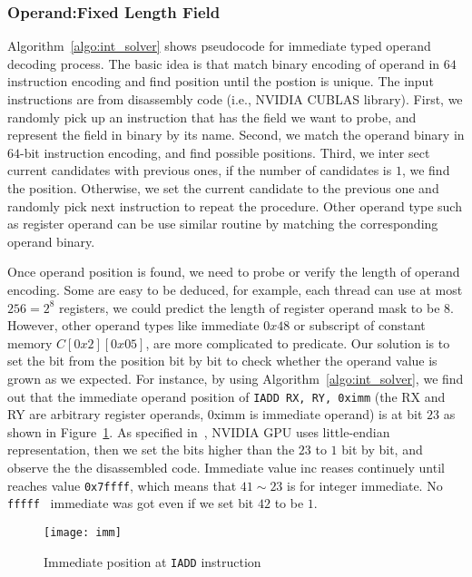 \subsubsection{Operand:Fixed Length Field}
Algorithm~\ref{algo:int_solver} shows pseudocode for immediate typed operand decoding process. 
The basic idea is that match binary encoding of operand in $64$ instruction encoding and find
position until the postion is unique. The input instructions are from disassembly code (i.e., NVIDIA CUBLAS library).
First, we randomly pick up an instruction that has the field we want to probe, and represent the field in binary by its 
name. Second, we match the operand binary in $64$-bit instruction encoding, and find possible positions. Third, we inter
sect current candidates with previous ones, if the number of candidates is $1$, we find the position. Otherwise, we set 
the current candidate to the previous one and randomly pick next instruction to repeat the procedure.
Other operand type such as register operand can be use similar routine by matching the corresponding operand binary.

Once operand position is found, we need to probe or verify the length of operand encoding. Some are easy to be
deduced, for example, each thread can use at most $256=2^{8}$ registers, we could predict the length of register operand
 mask to be $8$.
However, other operand types like immediate $0x48$ or subscript of constant memory $C[0x2][0x05]$, are more complicated 
to predicate. Our solution is to set the bit from the position bit by bit to check whether the operand value is grown as
 we expected. For instance, by using Algorithm~\ref{algo:int_solver}, we find out that the immediate operand position of
 {\tt IADD RX, RY, 0ximm} (the RX and RY are arbitrary register operands, 0ximm is immediate operand) is at bit $23$ as 
shown in Figure~\ref{fig:imm}. As specified in~\cite{cuda2015programming}, NVIDIA GPU uses little-endian representation,
 then we set the bits higher than the $23$ to $1$ bit by bit, and observe the the disassembled code. Immediate value inc
reases continuely until reaches value {\tt 0x7ffff}, which means that $41\sim23$ is for integer immediate. No {\tt fffff
} immediate was got even if we set bit $42$ to be $1$.  

\begin{figure}[htbp]
\begin{center}
\texttt{[image: imm]}
    \caption{Immediate position at {\tt IADD} instruction}
\label{fig:imm}
\end{center}
\end{figure}

